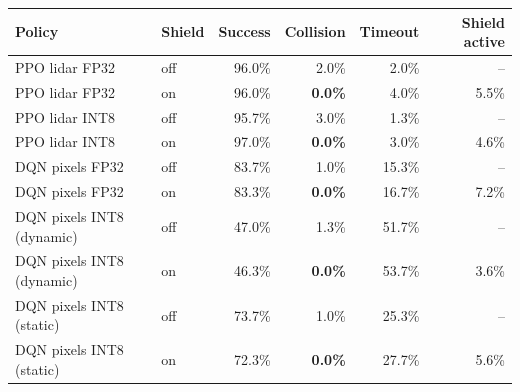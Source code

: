 \begin{tabular}{llrrrr}
\toprule
Policy & Shield & Success & Collision & Timeout & Shield active \\
\midrule
PPO lidar FP32 & off & 96.0\% & 2.0\% & 2.0\% & -- \\
PPO lidar FP32 & on & 96.0\% & \textbf{0.0\%} & 4.0\% & 5.5\% \\
\midrule
PPO lidar INT8 & off & 95.7\% & 3.0\% & 1.3\% & -- \\
PPO lidar INT8 & on & 97.0\% & \textbf{0.0\%} & 3.0\% & 4.6\% \\
\midrule
DQN pixels FP32 & off & 83.7\% & 1.0\% & 15.3\% & -- \\
DQN pixels FP32 & on & 83.3\% & \textbf{0.0\%} & 16.7\% & 7.2\% \\
\midrule
DQN pixels INT8 (dynamic) & off & 47.0\% & 1.3\% & 51.7\% & -- \\
DQN pixels INT8 (dynamic) & on & 46.3\% & \textbf{0.0\%} & 53.7\% & 3.6\% \\
\midrule
DQN pixels INT8 (static) & off & 73.7\% & 1.0\% & 25.3\% & -- \\
DQN pixels INT8 (static) & on & 72.3\% & \textbf{0.0\%} & 27.7\% & 5.6\% \\
\bottomrule
\end{tabular}
